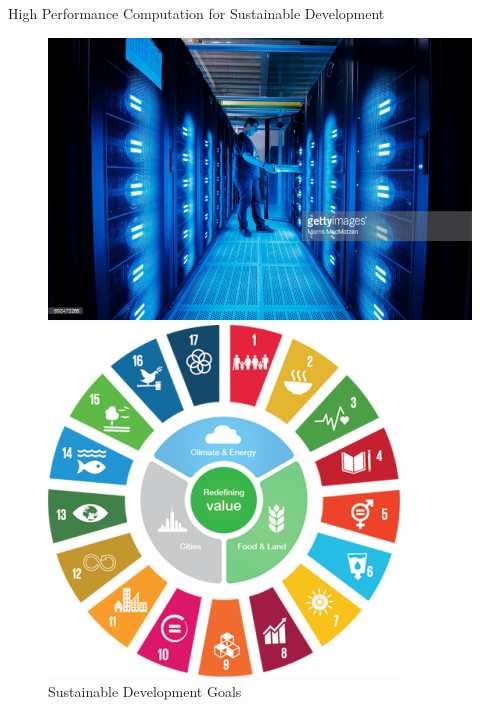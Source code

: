 \begin{frame}{High Performance Computation for Sustainable Development}
\begin{figure}[ht]
    \begin{minipage}[b]{0.55\linewidth}
	\centering
	\includegraphics[width=\textwidth]{./images/datacenter.png}            
	\caption{High Performance Computer}
	\label{fig:a}
    \end{minipage}
    \hspace{0.5cm}
    \begin{minipage}[b]{0.35\linewidth}
	\centering
	\includegraphics[width=\textwidth]{./images/SDGs.png}
	\caption{Sustainable Development Goals}
	\label{fig:b}
    \end{minipage}
\end{figure}



\end{frame}
